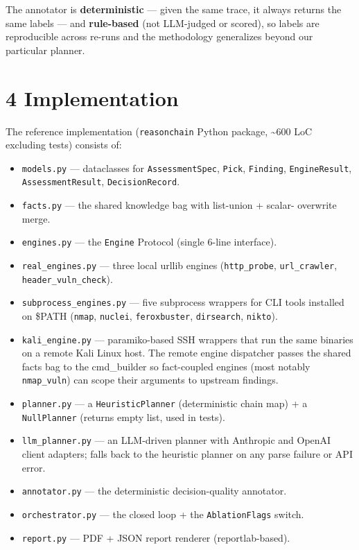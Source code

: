 \documentclass[
]{article}
\providecommand{\tightlist}{%
  \setlength{\itemsep}{0pt}\setlength{\parskip}{0pt}}
\begin{document}
The annotator is \textbf{deterministic} --- given the same trace, it
always returns the same labels --- and \textbf{rule-based} (not
LLM-judged or scored), so labels are reproducible across re-runs and the
methodology generalizes beyond our particular planner.

\section{4 Implementation}\label{implementation}

The reference implementation (\texttt{reasonchain} Python package,
\textasciitilde600 LoC excluding tests) consists of:

\begin{itemize}
\tightlist
\item
  \texttt{models.py} --- dataclasses for \texttt{AssessmentSpec},
  \texttt{Pick}, \texttt{Finding}, \texttt{EngineResult},
  \texttt{AssessmentResult}, \texttt{DecisionRecord}.
\item
  \texttt{facts.py} --- the shared knowledge bag with list-union +
  scalar- overwrite merge.
\item
  \texttt{engines.py} --- the \texttt{Engine} Protocol (single 6-line
  interface).
\item
  \texttt{real\_engines.py} --- three local urllib engines
  (\texttt{http\_probe}, \texttt{url\_crawler},
  \texttt{header\_vuln\_check}).
\item
  \texttt{subprocess\_engines.py} --- five subprocess wrappers for CLI
  tools installed on \$PATH (\texttt{nmap}, \texttt{nuclei},
  \texttt{feroxbuster}, \texttt{dirsearch}, \texttt{nikto}).
\item
  \texttt{kali\_engine.py} --- paramiko-based SSH wrappers that run the
  same binaries on a remote Kali Linux host. The remote engine
  dispatcher passes the shared facts bag to the cmd\_builder so
  fact-coupled engines (most notably \texttt{nmap\_vuln}) can scope
  their arguments to upstream findings.
\item
  \texttt{planner.py} --- a \texttt{HeuristicPlanner} (deterministic
  chain map) + a \texttt{NullPlanner} (returns empty list, used in
  tests).
\item
  \texttt{llm\_planner.py} --- an LLM-driven planner with Anthropic and
  OpenAI client adapters; falls back to the heuristic planner on any
  parse failure or API error.
\item
  \texttt{annotator.py} --- the deterministic decision-quality
  annotator.
\item
  \texttt{orchestrator.py} --- the closed loop + the
  \texttt{AblationFlags} switch.
\item
  \texttt{report.py} --- PDF + JSON report renderer (reportlab-based).
\end{itemize}
\end{document}

